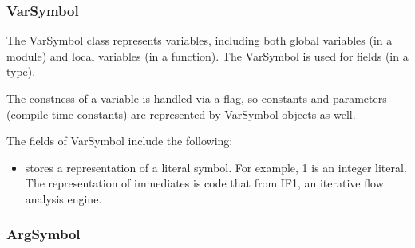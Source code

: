 \documentclass[10pt]{article}
\begin{document}
\subsubsection{VarSymbol}
\label{sec:varsymbol}

The VarSymbol class represents variables, including both global
variables (in a module) and local variables (in a function).  The
VarSymbol is used for fields (in a type).

The constness of a variable is handled via a flag, so constants and
parameters (compile-time constants) are represented by VarSymbol
objects as well.

The fields of VarSymbol include the following:
\begin{itemize}
\item {} stores a representation of a literal
  symbol.  For example, 1 is an integer literal.  The representation
  of immediates is code that from IF1, an iterative flow analysis
  engine.
\end{itemize}

\subsubsection{ArgSymbol}
\label{sec:argsymbol}
\end{document}
